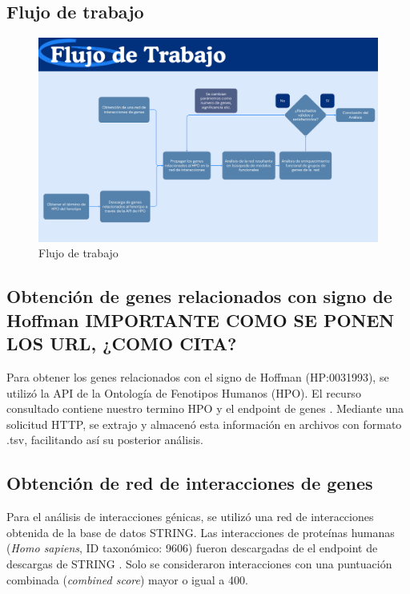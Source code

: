 \subsection{Flujo de trabajo}

\begin{figure}[h!]
	\includegraphics[width=.95\textwidth]{figures/workflow.png}
	\caption{Flujo de trabajo}
	\label{fig:workflow}
\end{figure}

\subsection{Obtención de genes relacionados con signo de Hoffman IMPORTANTE COMO SE PONEN LOS URL, ¿COMO CITA? }

Para obtener los genes relacionados con el signo de Hoffman (HP:0031993), se utilizó la API de la Ontología de Fenotipos Humanos (HPO). El recurso consultado contiene nuestro termino HPO y el endpoint de genes \cite{ontology_api}. Mediante una solicitud HTTP, se extrajo y almacenó esta información en archivos con formato .tsv, facilitando así su posterior análisis. 


\subsection{Obtención de red de interacciones de genes}

Para el análisis de interacciones génicas, se utilizó una red de interacciones obtenida de la base de datos STRING. Las interacciones de proteínas humanas (\textit{Homo sapiens}, ID taxonómico: 9606) fueron descargadas de el endpoint de descargas de STRING \cite{stringdb_human_proteins}. Solo se consideraron interacciones con una puntuación combinada (\textit{combined score}) mayor o igual a 400.


